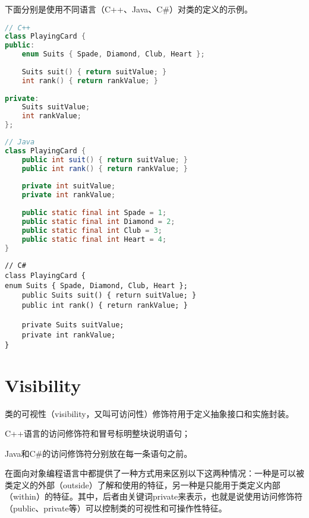 下面分别是使用不同语言（C++、Java、C\#）对类的定义的示例。

\begin{lstlisting}[language=C++]
// C++
class PlayingCard {
public:
	enum Suits { Spade, Diamond, Club, Heart };
	
	Suits suit() { return suitValue; }
	int rank() { return rankValue; }
	
private:
	Suits suitValue;
	int rankValue;
};
\end{lstlisting}



\begin{lstlisting}[language=Java]
// Java 
class PlayingCard {
	public int suit() { return suitValue; }
	public int rank() { return rankValue; }
	
	private int suitValue;
	private int rankValue;
	
	public static final int Spade = 1;
	public static final int Diamond = 2;
	public static final int Club = 3;
	public static final int Heart = 4;
}
\end{lstlisting}



\begin{lstlisting}[language={[Sharp]C}]
// C#
class PlayingCard {
enum Suits { Spade, Diamond, Club, Heart };
	public Suits suit() { return suitValue; }
	public int rank() { return rankValue; }
	
	private Suits suitValue;
	private int rankValue;
}
\end{lstlisting}


\section{Visibility}



类的可视性（visibility，又叫可访问性）修饰符用于定义抽象接口和实施封装。

\begin{compactitem}
\item C++语言的访问修饰符和冒号标明整块说明语句；
\item Java和C\#的访问修饰符分别放在每一条语句之前。
\end{compactitem}


在面向对象编程语言中都提供了一种方式用来区别以下这两种情况：一种是可以被类定义的外部（outside）了解和使用的特征，另一种是只能用于类定义内部（within）的特征。其中，后者由关键词private来表示，也就是说使用访问修饰符（public、private等）可以控制类的可视性和可操作性特征。


